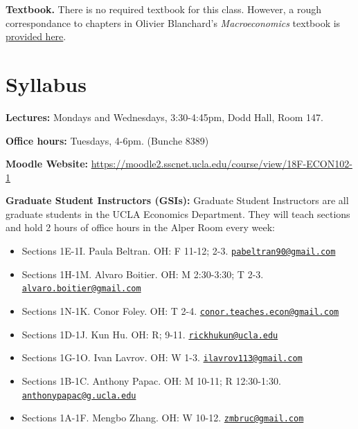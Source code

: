 \documentclass[]{book}
\providecommand{\tightlist}{%
  \setlength{\itemsep}{0pt}\setlength{\parskip}{0pt}}
\begin{document}
\textbf{Textbook.} There is no required textbook for this class.
However, a rough correspondance to chapters in Olivier Blanchard's
\emph{Macroeconomics} textbook is
\href{https://docs.google.com/spreadsheets/d/1OQzilQvOLusOsv16pJ3FgFN1YAadELe64jJAV2PEsF0/edit?usp=sharing}{provided
here}.

\chapter*{Syllabus}\label{syllabus}

\textbf{Lectures:} Mondays and Wednesdays, 3:30-4:45pm, Dodd Hall, Room
147.

\textbf{Office hours:} Tuesdays, 4-6pm. (Bunche 8389)

\textbf{Moodle Website:}
\url{https://moodle2.sscnet.ucla.edu/course/view/18F-ECON102-1}

\textbf{Graduate Student Instructors (GSIs):} Graduate Student
Instructors are all graduate students in the UCLA Economics Department.
They will teach sections and hold 2 hours of office hours in the Alper
Room every week:

\begin{itemize}
\tightlist
\item
  Sections 1E-1I. Paula Beltran. OH: F 11-12; 2-3.
  \href{mailto:pabeltran90@gmail.com}{\nolinkurl{pabeltran90@gmail.com}}
\item
  Sections 1H-1M. Alvaro Boitier. OH: M 2:30-3:30; T 2-3.
  \href{mailto:alvaro.boitier@gmail.com}{\nolinkurl{alvaro.boitier@gmail.com}}
\item
  Sections 1N-1K. Conor Foley. OH: T 2-4.
  \href{mailto:conor.teaches.econ@gmail.com}{\nolinkurl{conor.teaches.econ@gmail.com}}
\item
  Sections 1D-1J. Kun Hu. OH: R; 9-11.
  \href{mailto:rickhukun@ucla.edu}{\nolinkurl{rickhukun@ucla.edu}}
\item
  Sections 1G-1O. Ivan Lavrov. OH: W 1-3.
  \href{mailto:ilavrov113@gmail.com}{\nolinkurl{ilavrov113@gmail.com}}
\item
  Sections 1B-1C. Anthony Papac. OH: M 10-11; R 12:30-1:30.
  \href{mailto:anthonypapac@g.ucla.edu}{\nolinkurl{anthonypapac@g.ucla.edu}}
\item
  Sections 1A-1F. Mengbo Zhang. OH: W 10-12.
  \href{mailto:zmbruc@gmail.com}{\nolinkurl{zmbruc@gmail.com}}
\end{itemize}
\end{document}
